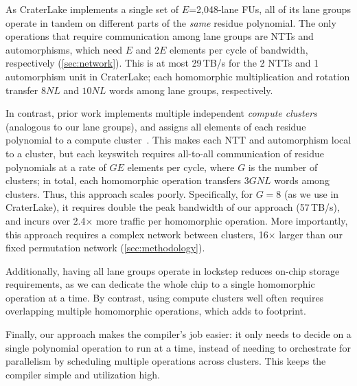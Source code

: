 As CraterLake implements a single set of $E$=2,048-lane FUs, all of its lane
groups operate in tandem on different parts of the \emph{same} residue
polynomial. The only operations that require communication among lane groups
are NTTs and automorphisms, which need $E$ and $2E$ elements per cycle of
bandwidth, respectively (\autoref{sec:network}). This is at most 29\,TB/s for
the 2 NTTs and 1 automorphism unit in CraterLake; each homomorphic multiplication
and rotation transfer $8NL$ and $10NL$ words among lane groups, respectively.

In contrast, prior work implements multiple independent \emph{compute clusters}
(analogous to our lane groups), and assigns all elements of each residue
polynomial to a compute cluster~\cite{riazi:asplos20:heax,feldmann:micro21:f1}.
This makes each NTT and automorphism local to a cluster, but each keyswitch
requires all-to-all communication of residue polynomials at a rate of $GE$
elements per cycle, where $G$ is the number of clusters; in total, each
homomorphic operation transfers $3GNL$ words among clusters. Thus, this
approach scales poorly. Specifically, for $G=8$ (as we use in CraterLake), it
requires double the peak bandwidth of our approach (57\,TB/s), and incurs over
2.4$\times$ more traffic per homomorphic operation. More importantly, this
approach requires a complex network between clusters, 16$\times$ larger than
our fixed permutation network (\autoref{sec:methodology}).

Additionally, having all lane groups operate in lockstep reduces on-chip
storage requirements, as we can dedicate the whole chip to a single homomorphic
operation at a time. By contrast, using compute clusters well often requires
overlapping multiple homomorphic operations, which adds to footprint.

Finally, our approach makes the compiler's job easier: it only needs to decide
on a single polynomial operation to run at a time, instead of needing to
orchestrate for parallelism by scheduling multiple operations across clusters.
This keeps the compiler simple and utilization high.

